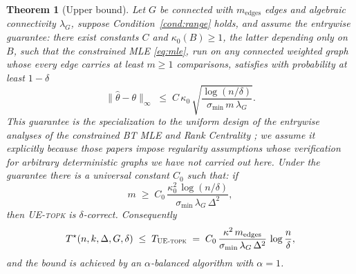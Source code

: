 \documentclass[11pt]{article}
\newtheorem{theorem}{Theorem}[section]
\theoremstyle{definition}
\newcommand{\lG}{\lambda_G}
\begin{document}
\begin{theorem}[Upper bound]
\label{thm:upper}
Let $G$ be connected with $m_{\mathrm{edges}}$ edges and algebraic connectivity $\lG$, suppose Condition~\ref{cond:range} holds, and assume the \emph{entrywise guarantee}: there exist constants $C$ and $\kappa_0(B)\ge1$, the latter depending only on $B$, such that the constrained MLE \eqref{eq:mle}, run on any connected weighted graph whose every edge carries at least $m\ge1$ comparisons, satisfies with probability at least $1-\delta$
\[
\|\hat\theta-\theta\|_\infty\;\le\;C\,\kappa_0\,\sqrt{\frac{\log(n/\delta)}{\sigma_{\min}\,m\,\lG}} .
\]
This guarantee is the specialization to the uniform design of the entrywise analyses of the constrained BT MLE and Rank Centrality \cite{yang2026graphmonotone,li2021ellinftybounds}; we assume it explicitly because those papers impose regularity assumptions whose verification for arbitrary deterministic graphs we have not carried out here.  Under the guarantee there is a universal constant $C_0$ such that: if
\[
m\;\ge\; C_0\,\frac{\kappa_0^2\,\log(n/\delta)}{\sigma_{\min}\,\lG\,\Delta^2},
\]
then \textsc{UE-topk} is $\delta$-correct.  Consequently
\[
T^\star(n,k,\Delta,G,\delta)\;\le\; T_{\textsc{UE-topk}}
\;=\; C_0\,\frac{\kappa^2\,m_{\mathrm{edges}}}{\sigma_{\min}\,\lG\,\Delta^2}\,\log\frac n\delta ,
\]
and the bound is achieved by an $\alpha$-balanced algorithm with $\alpha=1$.
\end{theorem}
\end{document}
